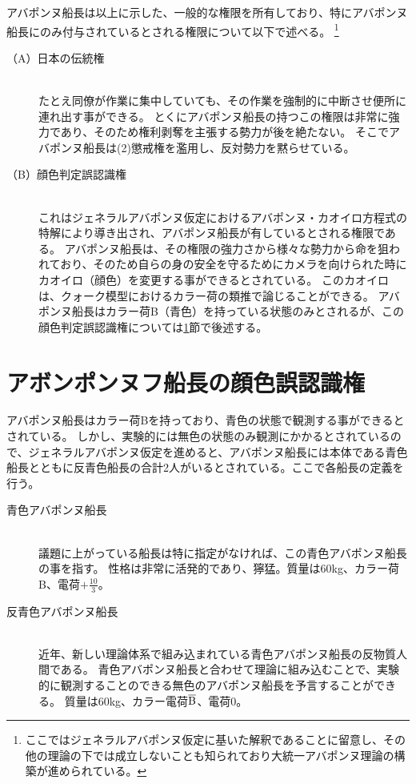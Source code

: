 アバポンヌ船長は以上に示した、一般的な権限を所有しており、特にアバポンヌ船長にのみ付与されているとされる権限について以下で述べる。
\footnote{ここではジェネラルアバポンヌ仮定に基いた解釈であることに留意し、その他の理論の下では成立しないことも知られており大統一アバポンヌ理論の構築が進められている。}

\begin{description}
\item[（A）日本の伝統権]\mbox{}\\
たとえ同僚が作業に集中していても、その作業を強制的に中断させ便所に連れ出す事ができる。
とくにアバポンヌ船長の持つこの権限は非常に強力であり、そのため権利剥奪を主張する勢力が後を絶たない。
そこでアバポンヌ船長は(2)懲戒権を濫用し、反対勢力を黙らせている。

\item[（B）顔色判定誤認識権]\mbox{}\\
これはジェネラルアバポンヌ仮定におけるアバポンヌ・カオイロ方程式の特解により導き出され、アバポンヌ船長が有しているとされる権限である。
アバポンヌ船長は、その権限の強力さから様々な勢力から命を狙われており、そのため自らの身の安全を守るためにカメラを向けられた時にカオイロ（顔色）を変更する事ができるとされている。
このカオイロは、クォーク模型におけるカラー荷の類推で論じることができる。
アバポンヌ船長はカラー荷B（青色）を持っている状態のみとされるが、この顔色判定誤認識権については\ref{KAO}節で後述する。
\end{description}

\section{アボンポンヌフ船長の顔色誤認識権}\label{KAO}
アバポンヌ船長はカラー荷Bを持っており、青色の状態で観測する事ができるとされている。
しかし、実験的には無色の状態のみ観測にかかるとされているので、ジェネラルアバポンヌ仮定を進めると、アバポンヌ船長には本体である青色船長とともに反青色船長の合計2人がいるとされている。ここで各船長の定義を行う。

\begin{description}
\item[青色アバポンヌ船長]\mbox{}\\
議題に上がっている船長は特に指定がなければ、この青色アバポンヌ船長の事を指す。
性格は非常に活発的であり、獰猛。質量は60kg、カラー荷B、電荷$+\frac{10}{3}$。

\item[反青色アバポンヌ船長]\mbox{}\\
近年、新しい理論体系で組み込まれている青色アバポンヌ船長の反物質人間である。
青色アバポンヌ船長と合わせて理論に組み込むことで、実験的に観測することのできる無色のアバポンヌ船長を予言することができる。
質量は60kg、カラー電荷$\overline{\rm{B}}$、電荷0。
\end{description}

